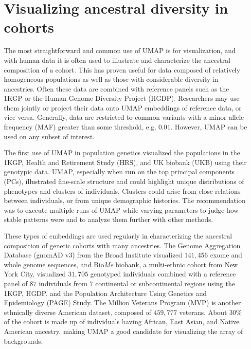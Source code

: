 \documentclass[12pt]{article}
\begin{document}
\section*{Visualizing ancestral diversity in cohorts}
The most straightforward and common use of UMAP is for visualization, and with human data it is often used to illustrate and characterize the ancestral composition of a cohort. This has proven useful for data composed of relatively homogeneous populations as well as those with considerable diversity in ancestries. Often these data are combined with reference panels such as the 1KGP or the Human Genome Diversity Project (HGDP)\cite{cann2002human}. Researchers may use them jointly or project their data onto UMAP embeddings of reference data, or vice versa. Generally, data are restricted to common variants with a minor allele frequency (MAF) greater than some threshold, e.g. $0.01$. However, UMAP can be used on any subset of interest.

The first use of UMAP in population genetics visualized the populations in the 1KGP, Health and Retirement Study (HRS)\cite{juster1995overview}, and UK biobank (UKB)\cite{sudlow2015uk} using their genotypic data. UMAP, especially when run on the top principal components (PCs), illustrated fine-scale structure and could highlight unique distributions of phenotypes and clusters of individuals. Clusters could arise from close relations between individuals, or from unique demographic histories. The recommendation was to execute multiple runs of UMAP while varying parameters to judge how stable patterns were and to analyze them further with other methods\cite{diaz-papkovich_umap_2019}.

These types of embeddings are used regularly in characterizing the ancestral composition of genetic cohorts with many ancestries. The Genome Aggregation Database (gnomAD v3) from the Broad Institute visualized $141,456$ exome and whole genome sequences\cite{karczewski_mutational_2020}, and Bio\textit{Me} biobank, a multi-ethnic cohort from New York City, visualized $31,705$ genotyped individuals combined with a reference panel of $87$ individuals from $7$ continental or subcontinental regions using the 1KGP, HGDP, and the Population Architecture Using Genetics and Epidemiology (PAGE) Study\cite{matise2011next}. The Million Veterans Program (MVP) is another ethnically diverse American dataset, composed of $459,777$ veterans. About $30\%$ of the cohort is made up of individuals having African, East Asian, and Native American ancestry\cite{hunter-zinck_genotyping_2020}, making UMAP a good candidate for visualizing the array of backgrounds.
\end{document}
